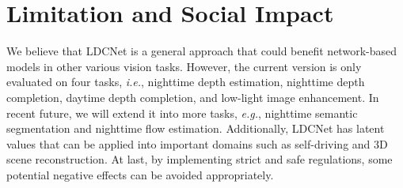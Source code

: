 \documentclass{article}
\begin{document}
\section{Limitation and Social Impact}\label{app_limitation}
We believe that LDCNet is a general approach that could benefit network-based models in other various vision tasks. However, the current version is only evaluated on four tasks, \emph{i.e.}, nighttime depth estimation, nighttime depth completion, daytime depth completion, and low-light image enhancement. In recent future, we will extend it into more tasks, \emph{e.g.}, nighttime semantic segmentation and nighttime flow estimation. Additionally, LDCNet has latent values that can be applied into important domains such as self-driving and 3D scene reconstruction. At last, by implementing strict and safe regulations, some potential negative effects can be avoided appropriately. 
\end{document}
